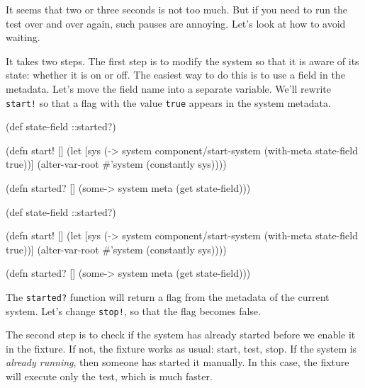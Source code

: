 It seems that two or three seconds is not too much. But if you need to run the test over and over again, such pauses are annoying. Let's look at how to avoid waiting.


It takes two steps. The first step is to modify the system so that it is aware of its state: whether it is on or off. The easiest way to do this is to use a field in the metadata. Let's move the field name into a separate variable. We'll rewrite \verb|start!| so that a flag with the value \verb|true| appears in the system metadata.

\ifnarrow

\begin{english}
  \begin{clojure}
(def state-field ::started?)

(defn start! []
  (let [sys
        (-> system
            component/start-system
            (with-meta
              {state-field true}))]
    (alter-var-root
      #'system (constantly sys))))

(defn started? []
  (some-> system meta (get state-field)))
  \end{clojure}
\end{english}

\else

\begin{english}
  \begin{clojure}
(def state-field ::started?)

(defn start! []
  (let [sys (-> system
                component/start-system
                (with-meta {state-field true}))]
    (alter-var-root #'system (constantly sys))))

(defn started? []
  (some-> system meta (get state-field)))
  \end{clojure}
\end{english}

\fi

The \verb|started?| function will return a flag from the metadata of the current system. Let's change \verb|stop!|, so that the flag becomes false.

The second step is to check if the system has already started before we enable it in the fixture. If not, the fixture works as usual: start, test, stop. If the system is \emph{already running}, then someone has started it manually. In this case, the fixture will execute only the test, which is much faster.

\ifnarrow

